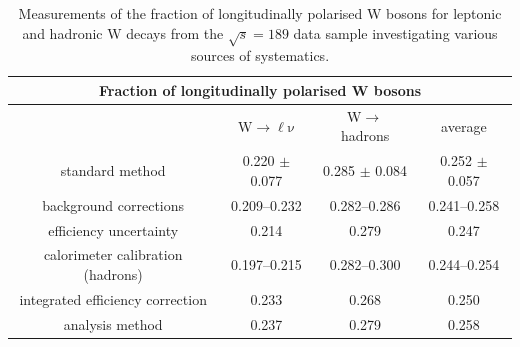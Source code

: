 \documentclass[12pt,a4paper,dvips]{article}
\newlength{\capindent}
\newlength{\capwidth}
\newcommand{\icaption}[2][!*!,!]{\hspace*{\capindent}%
  \begin{minipage}{\capwidth}
    \ifthenelse{\equal{#1}{!*!,!}}%
      {\caption{#2}}%
      {\caption[#1]{#2}}
  \end{minipage}}
\begin{document}
\begin{table}[htbp]
  \begin{center}
    \begin{tabular}{|c|c|c|c|}\hline
        \multicolumn{4}{|c|}{Fraction of longitudinally 
polarised W bosons}\\ \hline
      \hline \hline     
 &  W$\mathrm{\rightarrow \ell \nu}$   & W$\rightarrow$ hadrons & average \\
      \hline \hline
standard method                  & 0.220 $\pm$ 0.077 & 0.285 $\pm$ 0.084 & 
0.252 $\pm$ 0.057 \\ \hline
   \hline
background corrections           & 0.209--0.232  & 0.282--0.286 & 
0.241--0.258 \\
efficiency uncertainty         & 0.214        & 0.279       & 0.247 \\
calorimeter calibration (hadrons) & 0.197--0.215  & 0.282--0.300 
& 0.244--0.254 \\
integrated efficiency correction & 0.233        & 0.268       & 0.250 \\
analysis method                  & 0.237        & 0.279       & 0.258 \\
\hline
    \end{tabular}
    \icaption{Measurements of the fraction of longitudinally 
polarised W bosons for leptonic and hadronic W decays from the 
$\sqrt{s}=189$ \GeV{} data sample investigating 
various sources of systematics.
    \label{tab:table3}}
  \end{center}
\end{table}
\end{document}
